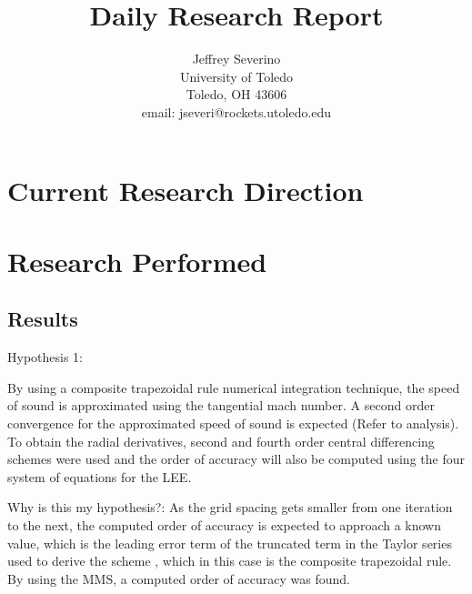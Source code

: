 \documentclass[a4paper]{article}
\begin{document}
\begin{titlepage}

    \title{
    Daily Research Report}

    \author{ Jeffrey Severino \\
        University of Toledo \\
        Toledo, OH  43606 \\
    email: jseveri@rockets.utoledo.edu}


    \maketitle

\end{titlepage}
\section{Current Research Direction}
\section{Research Performed}

\subsection{Results}

Hypothesis 1: 

By using a composite trapezoidal rule numerical integration technique, the speed
of sound is approximated using the tangential mach number. A second order 
convergence for the approximated speed of sound is expected (Refer to analysis). 
To obtain the radial derivatives, second and fourth order central differencing 
schemes were used and the order of accuracy will also be computed using the 
four system of equations for the LEE. 

Why is this my hypothesis?:
As the grid spacing gets smaller from one iteration to the next, the computed order of accuracy is
expected to approach a known value, which is the leading error term of the 
truncated term in the Taylor series used to derive the scheme , which in this
case is the composite trapezoidal rule. By using the MMS, a computed order
of accuracy was found. 



\begin{align}
     
\end{align}
\end{document}
